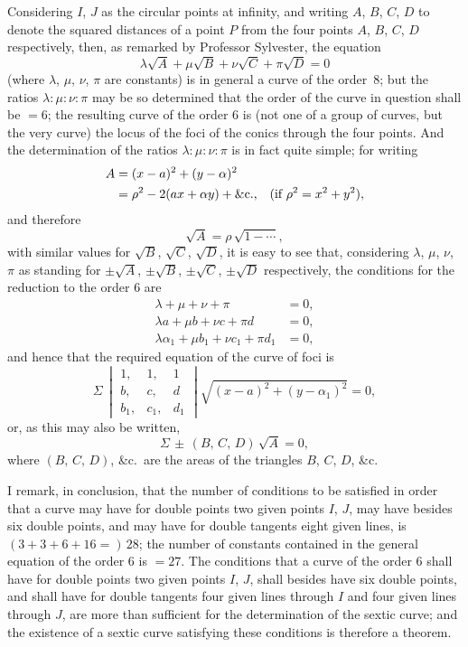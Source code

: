 \documentclass[11pt,a4paper]{article}
\begin{document}
Considering $I$, $J$ as the circular points at infinity, and writing
$A$, $B$, $C$, $D$ to denote the squared distances of a point $P$ from the four
points $A$, $B$, $C$, $D$ respectively, then, as remarked by Professor Sylvester,
the equation
\[
\lambda\sqrt{A} + \mu\sqrt{B} + \nu\sqrt{C} + \pi\sqrt{D} = 0
\]
(where $\lambda$, $\mu$, $\nu$, $\pi$ are constants) is in general a curve of the
order~8; but the ratios $\lambda : \mu : \nu : \pi$ may be so determined that the
order of the curve in question shall be $=6$; the resulting curve of the order
6 is (not one of a group of curves, but the very curve) the locus of the foci
of the conics through the four points.  And the determination of the ratios
$\lambda : \mu : \nu : \pi$ is in fact quite simple; for writing
\begin{align*}
A &= (x-a)^2 + (y-\alpha)^2 \\
  &= \rho^2 - 2(ax + \alpha y) + \&\text{c.,\quad} (\text{if } \rho^2 = x^2 + y^2),
\end{align*}
and therefore
\[
\sqrt{A} = \rho\,\sqrt{1 - \dotsb},
\]
with similar values for $\sqrt{B}$, $\sqrt{C}$, $\sqrt{D}$, it is easy to see that,
considering $\lambda$, $\mu$, $\nu$, $\pi$ as standing for $\pm\sqrt{A}$,
$\pm\sqrt{B}$, $\pm\sqrt{C}$, $\pm\sqrt{D}$ respectively, the conditions for the
reduction to the order 6 are
\begin{align*}
\lambda + \mu + \nu + \pi &= 0, \\
\lambda a + \mu b + \nu c + \pi d &= 0, \\
\lambda \alpha_1 + \mu b_1 + \nu c_1 + \pi d_1 &= 0,
\end{align*}
and hence that the required equation of the curve of foci is
\[
\Sigma\,\begin{vmatrix} 1, & 1, & 1 \\ b, & c, & d \\ b_1, & c_1, & d_1 \end{vmatrix}
\sqrt{(x-a)^2 + (y-\alpha_1)^2} = 0,
\]
or, as this may also be written,
\[
\Sigma\,\pm\,(B,\,C,\,D)\,\sqrt{A} = 0,
\]
where $(B,\,C,\,D)$, \&c.\ are the areas of the triangles $B$, $C$, $D$, \&c.

I remark, in conclusion, that the number of conditions to be satisfied in order
that a curve may have for double points two given points $I$, $J$, may have
besides six double points, and may have for double tangents eight given lines,
is $(3+3+6+16=)\,28$; the number of constants contained in the general equation
of the order 6 is $=27$.  The conditions that a curve of the order 6 shall
have for double points two given points $I$, $J$, shall besides have six double
points, and shall have for double tangents four given lines through $I$ and
four given lines through $J$, are more than sufficient for the determination of
the sextic curve; and the existence of a sextic curve satisfying these
conditions is therefore a theorem.
\end{document}
